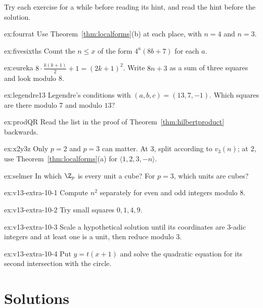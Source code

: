 Try each exercise for a while before reading its hint, and read the hint before the solution.

\begin{hint}{ex:fourrat}
Use Theorem~\ref{thm:localforms}(b) at each place, with $n=4$ and $n=3$.
\end{hint}
\begin{hint}{ex:fivesixths}
Count the $n\le x$ of the form $4^a(8b+7)$ for each $a$.
\end{hint}
\begin{hint}{ex:eureka}
$8\cdot\frac{k(k+1)}2+1=(2k+1)^2$. Write $8n+3$ as a sum of three squares and look modulo $8$.
\end{hint}
\begin{hint}{ex:legendre13}
Legendre's conditions with $(a,b,c)=(13,7,-1)$. Which squares are there modulo $7$ and modulo $13$?
\end{hint}
\begin{hint}{ex:prodQR}
Read the list in the proof of Theorem~\ref{thm:hilbertproduct} backwards.
\end{hint}
\begin{hint}{ex:x2y3z}
Only $p=2$ and $p=3$ can matter. At $3$, split according to $v_3(n)$; at $2$, use Theorem~\ref{thm:localforms}(a) for
$\langle1,2,3,-n\rangle$.
\end{hint}
\begin{hint}{ex:selmer}
In which $\Z_p$ is every unit a cube? For $p=3$, which units are cubes?
\end{hint}

\begin{hint}{ex:v13-extra-10-1}
Compute $n^2$ separately for even and odd integers modulo $8$.
\end{hint}

\begin{hint}{ex:v13-extra-10-2}
Try small squares $0,1,4,9$.
\end{hint}

\begin{hint}{ex:v13-extra-10-3}
Scale a hypothetical solution until its coordinates are $3$-adic integers and at least one is a unit, then reduce modulo $3$.
\end{hint}

\begin{hint}{ex:v13-extra-10-4}
Put $y=t(x+1)$ and solve the quadratic equation for its second intersection with the circle.
\end{hint}

\section{Solutions}

